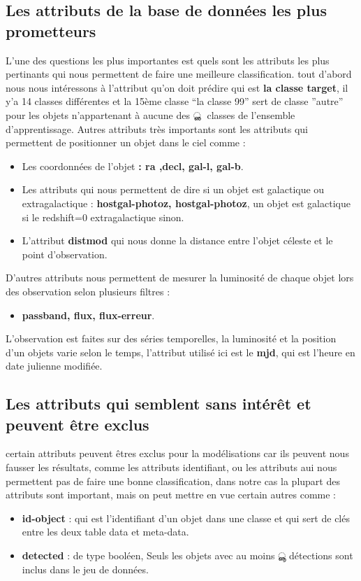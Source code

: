 \subsection{Les attributs de la base de données les plus prometteurs}
L’une des questions les plus importantes est quels sont les attributs les plus pertinants qui nous permettent de faire une meilleure classification. tout d’abord nous nous intéressons à l’attribut qu’on doit prédire qui est \textbf{la classe target}, il y’a 14 classes différentes et la 15ème classe “la classe 99” sert de classe ”autre” pour les objets n’appartenant à aucune des ൢ൥ classes de l’ensemble d’apprentissage.
\newline
Autres attributs très importants sont les attributs qui permettent de positionner un objet dans le ciel comme :
\begin{itemize}
    \item Les coordonnées de l’objet \textbf{: ra ,decl, gal-l, gal-b}.
    \item Les attributs qui nous permettent de dire si un objet est galactique ou extragalactique :\textbf{ hostgal-photoz, hostgal-photoz}, un objet est galactique si le redshift=0 extragalactique sinon.
    \item L’attribut \textbf{distmod} qui nous donne la distance entre l’objet céleste et le point d’observation.
\end{itemize}
\newline
D’autres attributs nous permettent de mesurer la luminosité de chaque objet lors des observation selon plusieurs filtres :
\begin{itemize}
    \item \textbf{passband, flux, flux-erreur}.
\end{itemize}
\newline
L’observation est faites sur des séries temporelles, la luminosité et la position d’un objets varie selon le temps, l’attribut utilisé ici est le \textbf{mjd}, qui est l’heure en date julienne modifiée.

\subsection{Les attributs qui semblent sans intérêt et peuvent être exclus}
certain attributs peuvent êtres exclus pour la modélisations car ils peuvent nous fausser les résultats, comme les attributs identifiant, ou les attributs aui nous permettent pas de faire une bonne classification, dans notre cas la plupart des attributs sont important, mais on peut mettre en vue certain autres comme :
\begin{itemize}
    \item \textbf{id-object }: qui est l’identifiant d’un objet dans une classe et qui sert de clés entre les deux table data et meta-data.
    \item \textbf{detected }: de type booléen, Seuls les objets avec au moins ൣ détections sont inclus
dans le jeu de données.
\end{itemize}
